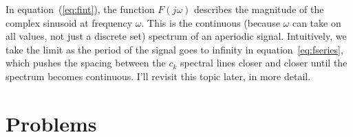 In equation~(\ref{eq:fint}), the function $F(j\omega)$ describes the
magnitude of the complex sinusoid at frequency $\omega$.  This is the
continuous (because $\omega$ can take on all values, not just a
discrete set) spectrum of an aperiodic signal. Intuitively, we take the limit as the period of the signal goes to infinity in equation~\ref{eq:fseries}, which pushes the spacing between the $c_k$ spectral lines closer and closer until the spectrum becomes continuous. I'll revisit this
topic later, in more detail.

\section{Problems}

%
%

